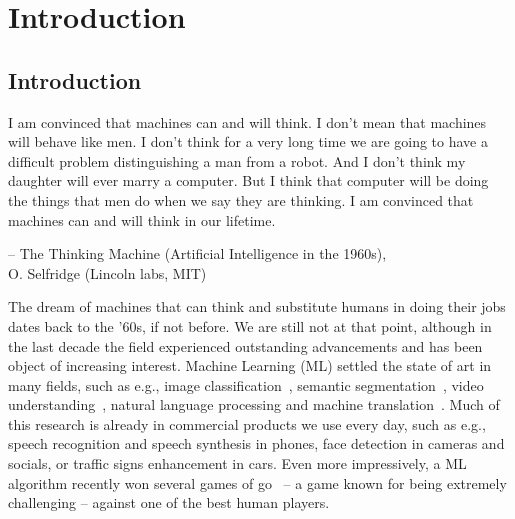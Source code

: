 \chapter{Introduction}


\section{Introduction}\label{sec:i}
{
    \setlength\epigraphwidth{10cm}
    \setlength\epigraphrule{0pt}
    \renewcommand{\epigraphflush}{center}
    \epigraph{
        I am convinced that machines can and will think. I don't mean that
        machines will behave like men. I don't think for a very long time we
        are going to have a difficult problem distinguishing a man from a
        robot. And I don't think my daughter will ever marry a computer. But I
        think that computer will be doing the things that men do when we say
        they are thinking. I am convinced that machines can and will think in
        our lifetime.}{-- \textup{The Thinking Machine (Artificial Intelligence
            in the 1960s)}, \\ O. Selfridge (Lincoln labs, MIT)}
}

The dream of machines that can think and substitute humans in doing their jobs
dates back to the '60s, if not before. We are still not at that point, although
in the last decade the field experienced outstanding advancements and has been
object of increasing interest. Machine Learning (ML) settled the state of art
in many fields, such as e.g., image classification~\cite{Krizhevsky-2012,
szegedy2016inception, visin2015renet}, semantic
segmentation~\cite{chen2015semantic, visin15}, video
understanding~\citep{srivastava2015unsupervised, Xu-et-al-arxiv2015}, natural
language processing and machine translation~\citep{Bahdanau-et-al-arxiv2014}.
Much of this research is already in commercial products we use every day, such
as e.g., speech recognition and speech synthesis in phones, face detection in
cameras and socials, or traffic signs enhancement in cars. Even more
impressively, a ML algorithm recently won several games of
go~\citep{silver2016alphago} -- a game known for being extremely challenging --
against one of the best human players.

